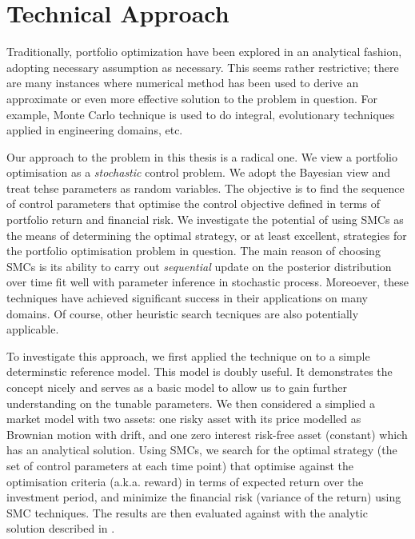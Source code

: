 \section{Technical Approach}
Traditionally, portfolio optimization have been explored in an analytical fashion, adopting necessary assumption as necessary. This seems rather restrictive; there are many instances where numerical method has been used to derive an approximate or even more effective solution to the problem in question. For example, Monte Carlo technique is used to do integral, evolutionary techniques applied in engineering domains, etc.

Our approach to the problem in this thesis is a radical one. We view a portfolio optimisation as a \emph{stochastic} control problem. We adopt the Bayesian view and treat tehse parameters as random variables. The objective is to find the sequence of control parameters that optimise the control objective defined in terms of portfolio return and financial risk. We investigate the potential of using SMCs as the means of determining the optimal strategy, or at least excellent, strategies for the portfolio optimisation problem in question. The main reason of choosing SMCs is its ability to carry out \emph{sequential} update on the posterior distribution over time fit well with parameter inference in stochastic process. Moreoever, these techniques have achieved significant success in their applications on many domains. Of course, other heuristic search tecniques are also potentially applicable.

To investigate this approach, we first applied the technique on to a simple determinstic reference model. This model is doubly useful. It demonstrates the concept nicely and serves as a basic model to allow us to gain further understanding on the tunable parameters. We then considered a simplied a market model with two assets: one risky asset with its price modelled as Brownian motion with drift, and one zero interest risk-free asset (constant) which has an analytical solution. Using SMCs, we search for the optimal strategy (the set of control parameters at each time point) that optimise against the optimisation criteria (a.k.a. reward) in terms of expected return over the investment period, and minimize the financial risk (variance of the return) using SMC techniques. The results are then evaluated against with the analytic solution described in \cite{MF14}.


